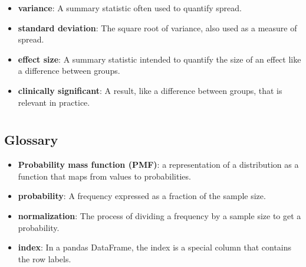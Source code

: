 \begin{itemize}
	\item {\bf variance}: A summary statistic often used to quantify spread.
	
	\item {\bf standard deviation}: The square root of variance, also used
	as a measure of spread.
	
	\item {\bf effect size}: A summary statistic intended to quantify the size
	of an effect like a difference between groups.
	
	\item {\bf clinically significant}: A result, like a difference between groups,
	that is relevant in practice.
	
\end{itemize}



 \chapter{ }  \section*{Glossary} \begin{itemize}
	
	\item {\bf Probability mass function (PMF)}: a representation of a distribution
	as a function that maps from values to probabilities.
	
	\item {\bf probability}: A frequency expressed as a fraction of the sample
	size.
	
	\item {\bf normalization}: The process of dividing a frequency by a sample
	size to get a probability.
	
	\item {\bf index}: In a pandas DataFrame, the index is a special column
	that contains the row labels.
	
\end{itemize}




